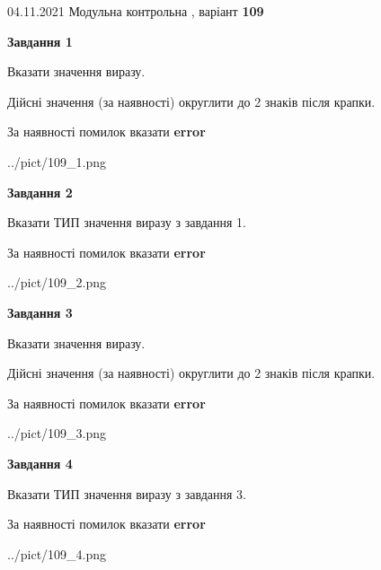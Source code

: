 \documentclass[11pt, ukrainian]{article}
\begin{document}
{04.11.2021 Модульна контрольна , варіант  \No \textbf { 109 }\par}
{
\begin {large}
{\begin {center}\textbf{Завдання 1}\end {center}}\par
Вказати значення виразу. \par
Дійсні значення (за наявності) округлити до 2 знаків після крапки. \par
За наявності помилок вказати \textbf{error}

\begin{center}
	{../pict/109_1.png}
\end{center}
\newpage

{\begin {center}\textbf{Завдання 2}\end {center}}\par
Вказати ТИП значення виразу з завдання 1. \par
За наявності помилок вказати \textbf{error}

\begin{center}
	{../pict/109_2.png}
\end{center}
\newpage

{\begin {center}\textbf{Завдання 3}\end {center}}\par
Вказати значення виразу. \par
Дійсні значення (за наявності) округлити до 2 знаків після крапки. \par
За наявності помилок вказати \textbf{error}

\begin{center}
	{../pict/109_3.png}
\end{center}
\newpage

{\begin {center}\textbf{Завдання 4}\end {center}}\par
Вказати ТИП значення виразу з завдання 3. \par
За наявності помилок вказати \textbf{error}

\begin{center}
	{../pict/109_4.png}
\end{center}
\newpage


\end{large}}
\end{document}
